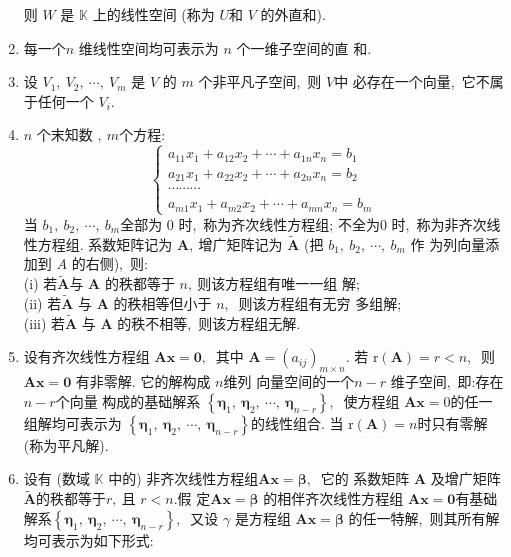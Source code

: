 \begin{enumerate}
		则 $ W $ 是 $ \mathbb{K} $ 上的线性空间 (称为  $U  $和 $ V$  的外直和).
		\item 每一个$  n $ 维线性空间均可表示为  $n $ 个一维子空间的直 和.
		\item 设 $ V_{1},\  V_{2},\  \cdots,\  V_{m} $ 是 $ V $ 的 $ m$ 个非平凡子空间,\ 则  $V  $中 必存在一个向量,\  它不属于任何一个 $ V_{i} .$
		\item $n $ 个末知数  $,\ m  $个方程:
		$$\left\{\begin{array}{r}
			a_{11} x_{1}+a_{12} x_{2}+\cdots+a_{1 n} x_{n}=b_{1} \\
			a_{21} x_{1}+a_{22} x_{2}+\cdots+a_{2 n} x_{n}=b_{2} \\
			\cdots \cdots \cdots \\
			a_{m 1} x_{1}+a_{m 2} x_{2}+\cdots+a_{m n} x_{n}=b_{m}
		\end{array}\right.$$
		当 $ b_{1},\  b_{2},\  \cdots,\  b_{m}  $全部为 $0$ 时,\  称为齐次线性方程组;
		不全为$ 0$ 时,\  称为非齐次线性方程组.
		系数矩阵记为  $\boldsymbol{A} ,\  $增广矩阵记为  $\widetilde{\boldsymbol{A}} $ (把 $ b_{1},\  b_{2},\  \cdots,\  b_{m}$  作 为列向量添加到  $A$  的右侧),\  则:\\
		(i) 若$  \tilde{\boldsymbol{A}}  $与 $ \boldsymbol{A} $ 的秩都等于 $ n ,\  $则该方程组有唯一一组 解;\\
		(ii) 若$  \tilde{\boldsymbol{A}} $ 与  $\boldsymbol{A} $ 的秩相等但小于  $n ,\ $ 则该方程组有无穷 多组解;\\
		(iii) 若$  \tilde{\boldsymbol{A}} $ 与  $\boldsymbol{A} $ 的秩不相等,\  则该方程组无解.
		\item 设有齐次线性方程组 $ \boldsymbol{A x}=\mathbf{0},\ $ 其中  $\boldsymbol{A}=\left(a_{i j}\right)_{m \times n} .$ 若  $\mathrm{r}(\boldsymbol{A})=r<n ,\ $ 则  $\boldsymbol{A} \boldsymbol{x}=\mathbf{0}$  有非零解. 它的解构成 $ n  $维列 向量空间的一个$  n-r $ 维子空间,\  即:存在 $ n-r  $个向量 构成的基础解系  $\left\{\boldsymbol{\eta}_{1},\  \boldsymbol{\eta}_{2},\  \cdots,\  \boldsymbol{\eta}_{n-r}\right\} ,\ $ 使方程组 $ \boldsymbol{A x}=0  $的任一组解均可表示为 $ \left\{\boldsymbol{\eta}_{1},\  \boldsymbol{\eta}_{2},\  \cdots,\  \boldsymbol{\eta}_{n-r}\right\}  $的线性组合. 当  $\mathrm{r}(\boldsymbol{A})=n  $时只有零解 (称为平凡解).
		\item 设有 (数域 $ \mathbb{K} $ 中的) 非齐次线性方程组$  \boldsymbol{A x}=\boldsymbol{\beta} ,\ $ 它的 系数矩阵 $ \boldsymbol{A} $ 及增广矩阵  $\tilde{\boldsymbol{A}}  $的秩都等于$  r ,\  $且  $r<n . $假 定$ \boldsymbol{A x}=\boldsymbol{\beta}$ 的相伴齐次线性方程组 $ \boldsymbol{Ax}=\boldsymbol{0} $有基础解系$  \left\{\boldsymbol{\eta}_{1},\  \boldsymbol{\eta}_{2},\  \cdots,\  \boldsymbol{\eta}_{n-r}\right\} ,\ $ 又设  $\gamma $ 是方程组  $\boldsymbol{A x}=\boldsymbol{\beta}$  的任一特解,\  则其所有解均可表示为如下形式:

\end{enumerate}

